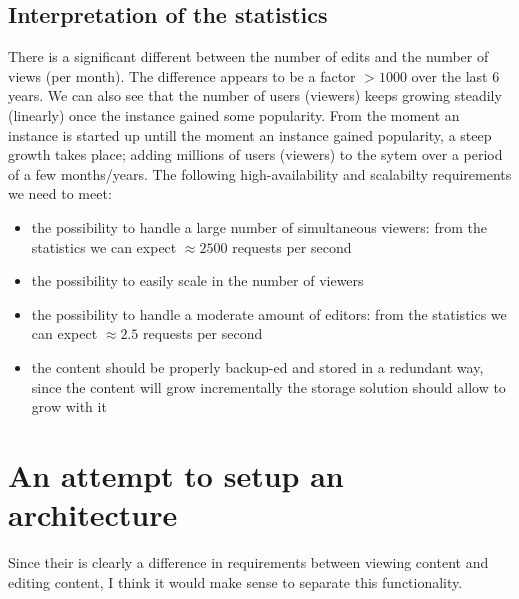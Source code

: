 \documentclass[12pt]{report}
\begin{document}
\subsection{Interpretation of the statistics}
There is a significant different between the number of edits and the
number of views (per month).
The difference appears to be a factor $>1000$ over the last 6 years.
We can also see that the number of users (viewers) keeps growing
steadily (linearly) once the instance gained some popularity. 
From the moment an instance is started up untill the moment an
instance gained popularity, a steep growth takes place; adding
millions of users (viewers) to the sytem over a period of a few
months/years.
The following high-availability and scalabilty requirements we need to meet:
\begin{itemize}
\item the possibility to handle a large number of
  simultaneous viewers: from the statistics we can expect $\approx 2500$
  requests per second
\item the possibility to easily scale in the number of viewers
\item the possibility to handle a moderate amount of editors: from the
  statistics we can expect $\approx 2.5$ requests per second
\item the content should be properly backup-ed and stored in a
  redundant way, since the content will grow incrementally the storage
  solution should allow to grow with it
\end{itemize}

\section{An attempt to setup an architecture}
Since their is clearly a difference in requirements between viewing content and
editing content, I think it would make sense to separate this
functionality.
\end{document}

